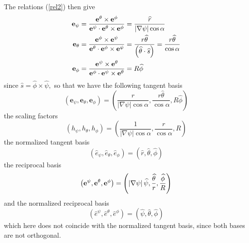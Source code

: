 The relations (\ref{rel2}) then give 
\begin{align}
\mathbf{e}_{\psi }& =\frac{\mathbf{e}^{\theta }\times \mathbf{e}^{\phi }}{%
\mathbf{e}^{\psi }\cdot \mathbf{e}^{\theta }\times \mathbf{e}^{\phi }}=\frac{%
\widehat{r}}{\left\vert \nabla \psi \right\vert \cos \alpha } \\
\mathbf{e}_{\theta }& =\frac{\mathbf{e}^{\phi }\times \mathbf{e}^{\psi }}{%
\mathbf{e}^{\theta }\cdot \mathbf{e}^{\phi }\times \mathbf{e}^{\psi }}=\frac{%
r\widehat{\theta }}{\left( \widehat{\theta }\cdot \widehat{s}\right) }=\frac{%
r\widehat{\theta }}{\cos \alpha } \\
\mathbf{e}_{\phi }& =\frac{\mathbf{e}^{\psi }\times \mathbf{e}^{\theta }}{%
\mathbf{e}^{\phi }\cdot \mathbf{e}^{\psi }\times \mathbf{e}^{\theta }}=R%
\widehat{\phi }
\end{align}%
since $\widehat{s}=\widehat{\phi }\times \widehat{\psi },$ so that we have
the following tangent basis 
\begin{equation}
\left( \mathbf{e}_{\psi },\mathbf{e}_{\theta },\mathbf{e}_{\phi }\right)
=\left( \frac{\widehat{r}}{\left\vert \nabla \psi \right\vert \cos \alpha },%
\frac{r\widehat{\theta }}{\cos \alpha },R\widehat{\phi }\right) 
\label{covpsit2}
\end{equation}%
the scaling factors 
\begin{equation}
\left( h_{\psi },h_{\theta },h_{\phi }\right) =\left( \frac{1}{\left\vert
\nabla \psi \right\vert \cos \alpha },\frac{r}{\cos \alpha },R\right) 
\end{equation}%
the normalized tangent basis 
\begin{equation}
\left( \widehat{e}_{\psi },\widehat{e}_{\theta },\widehat{e}_{\phi }\right)
=\left( \widehat{r},\widehat{\theta },\widehat{\phi }\right) 
\end{equation}%
the reciprocal basis 
\begin{equation}
\left( \mathbf{e}^{\psi },\mathbf{e}^{\theta },\mathbf{e}^{\phi }\right)
=\left( \left\vert \nabla \psi \right\vert \widehat{\psi },\frac{\widehat{%
\theta }}{r},\frac{\widehat{\phi }}{R}\right) 
\end{equation}%
and the normalized reciprocal basis 
\begin{equation}
\left( \widehat{e}^{\psi },\widehat{e}^{\theta },\widehat{e}^{\phi }\right)
=\left( \widehat{\psi },\widehat{\theta },\widehat{\phi }\right) 
\end{equation}%
which here does not coincide with the normalized tangent basis, since both
bases are not orthogonal.

